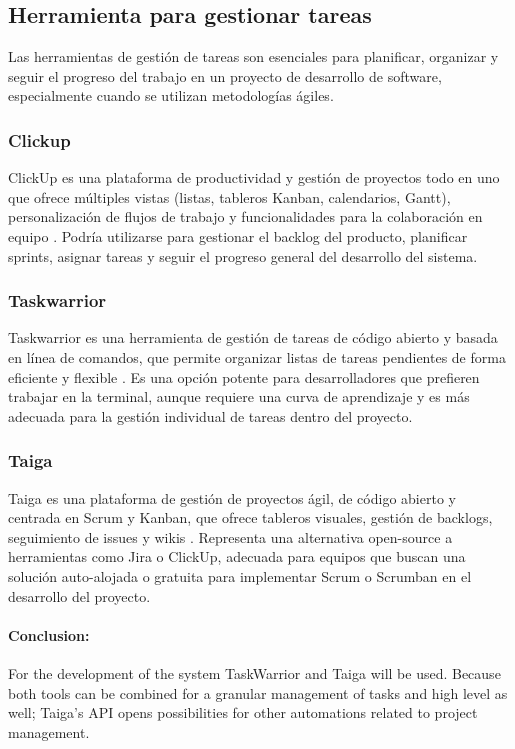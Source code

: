 \subsection{Herramienta para gestionar tareas}
Las herramientas de gestión de tareas son esenciales para planificar, organizar y seguir el progreso del trabajo en un proyecto de desarrollo de software, especialmente cuando se utilizan metodologías ágiles.

\subsubsection{Clickup}
ClickUp es una plataforma de productividad y gestión de proyectos todo en uno que ofrece múltiples vistas (listas, tableros Kanban, calendarios, Gantt), personalización de flujos de trabajo y funcionalidades para la colaboración en equipo \parencite{ClickUp}.
Podría utilizarse para gestionar el backlog del producto, planificar sprints, asignar tareas y seguir el progreso general del desarrollo del sistema.

\subsubsection{Taskwarrior}
Taskwarrior es una herramienta de gestión de tareas de código abierto y basada en línea de comandos, que permite organizar listas de tareas pendientes de forma eficiente y flexible \parencite{Taskwarrior}.
Es una opción potente para desarrolladores que prefieren trabajar en la terminal, aunque requiere una curva de aprendizaje y es más adecuada para la gestión individual de tareas dentro del proyecto.

\subsubsection{Taiga}
Taiga es una plataforma de gestión de proyectos ágil, de código abierto y centrada en Scrum y Kanban, que ofrece tableros visuales, gestión de backlogs, seguimiento de issues y wikis \parencite{Taiga}.
Representa una alternativa open-source a herramientas como Jira o ClickUp, adecuada para equipos que buscan una solución auto-alojada o gratuita para implementar Scrum o Scrumban en el desarrollo del proyecto.

\paragraph{Conclusion:} For the development of the system TaskWarrior and Taiga will be used.
Because both tools can be combined for a granular management of tasks and high level as well; Taiga's API opens possibilities for other automations related to project management.
